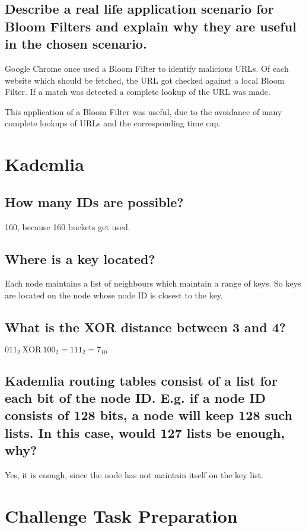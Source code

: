 \documentclass{article}
\begin{document}
\subsection{Describe a real life application scenario for Bloom 
Filters and explain why they are useful in the chosen scenario.}

  Google Chrome once used a Bloom Filter to identify malicious URLs. Of each
  website which should be fetched, the URL got checked against a local Bloom Filter.
  If a match was detected a complete lookup of the URL was made. 

  This application of a Bloom Filter was useful, due to the avoidance of
  many complete lookups of URLs and the corresponding time cap.


\section{Kademlia}

\subsection{How many IDs are possible?}

  160, because 160 buckets get used.

\subsection{Where is a key located?}

  Each node maintains a list of neighbours which maintain a range of keys.
  So keys are located on the node whose node ID is closest to the key.

\subsection{What is the XOR distance between 3 and 4?}

  ${011}_2\ \text{XOR}\ {100}_2 = {111}_2 = 7_{10}$

\subsection{Kademlia routing tables consist of a list for each bit of the node ID. E.g. if 
a node ID consists of 128 bits, a node will keep 128 such lists. In this case, would 127
lists be enough, why?}

  Yes, it is enough, since the node has not maintain itself on the key list.

\section{Challenge Task Preparation}



\end{document}
